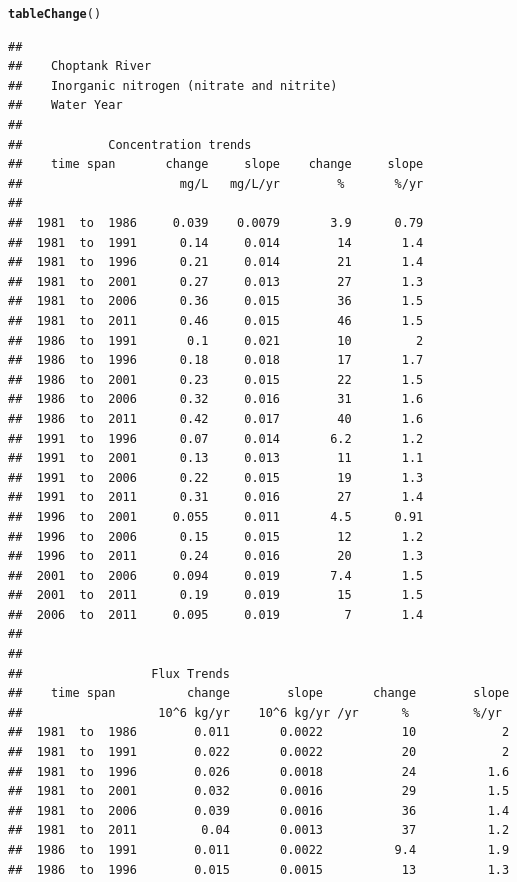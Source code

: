 \documentclass[a4paper,11pt]{article}\usepackage{graphicx, color}
\makeatletter
\newcommand{\hlfunctioncall}[1]{\textcolor[rgb]{0.501960784313725,0,0.329411764705882}{\textbf{#1}}}%
\newenvironment{kframe}{%
 \def\at@end@of@kframe{}%
 \ifinner\ifhmode%
  \def\at@end@of@kframe{\end{minipage}}%
  \begin{minipage}{\columnwidth}%
 \fi\fi%
 \def\FrameCommand##1{\hskip\@totalleftmargin \hskip-\fboxsep
 \colorbox{shadecolor}{##1}\hskip-\fboxsep
     \hskip-\linewidth \hskip-\@totalleftmargin \hskip\columnwidth}%
 \MakeFramed {\advance\hsize-\width
   \@totalleftmargin\z@ \linewidth\hsize
   \@setminipage}}%
 {\par\unskip\endMakeFramed%
 \at@end@of@kframe}
\newenvironment{knitrout}{}{} %
\makeatother
\begin{document}
\begin{knitrout}
\color{fgcolor}\begin{kframe}
\begin{alltt}
\hlfunctioncall{tableChange}()
\end{alltt}
\begin{verbatim}
## 
##    Choptank River 
##    Inorganic nitrogen (nitrate and nitrite)
##    Water Year 
## 
##            Concentration trends
##    time span       change     slope    change     slope
##                      mg/L   mg/L/yr        %       %/yr
## 
##  1981  to  1986     0.039    0.0079       3.9      0.79
##  1981  to  1991      0.14     0.014        14       1.4
##  1981  to  1996      0.21     0.014        21       1.4
##  1981  to  2001      0.27     0.013        27       1.3
##  1981  to  2006      0.36     0.015        36       1.5
##  1981  to  2011      0.46     0.015        46       1.5
##  1986  to  1991       0.1     0.021        10         2
##  1986  to  1996      0.18     0.018        17       1.7
##  1986  to  2001      0.23     0.015        22       1.5
##  1986  to  2006      0.32     0.016        31       1.6
##  1986  to  2011      0.42     0.017        40       1.6
##  1991  to  1996      0.07     0.014       6.2       1.2
##  1991  to  2001      0.13     0.013        11       1.1
##  1991  to  2006      0.22     0.015        19       1.3
##  1991  to  2011      0.31     0.016        27       1.4
##  1996  to  2001     0.055     0.011       4.5      0.91
##  1996  to  2006      0.15     0.015        12       1.2
##  1996  to  2011      0.24     0.016        20       1.3
##  2001  to  2006     0.094     0.019       7.4       1.5
##  2001  to  2011      0.19     0.019        15       1.5
##  2006  to  2011     0.095     0.019         7       1.4
## 
## 
##                  Flux Trends
##    time span          change        slope       change        slope
##                   10^6 kg/yr    10^6 kg/yr /yr      %         %/yr
##  1981  to  1986        0.011       0.0022           10            2
##  1981  to  1991        0.022       0.0022           20            2
##  1981  to  1996        0.026       0.0018           24          1.6
##  1981  to  2001        0.032       0.0016           29          1.5
##  1981  to  2006        0.039       0.0016           36          1.4
##  1981  to  2011         0.04       0.0013           37          1.2
##  1986  to  1991        0.011       0.0022          9.4          1.9
##  1986  to  1996        0.015       0.0015           13          1.3

\end{verbatim}
\end{kframe}
\end{knitrout}
\end{document}

